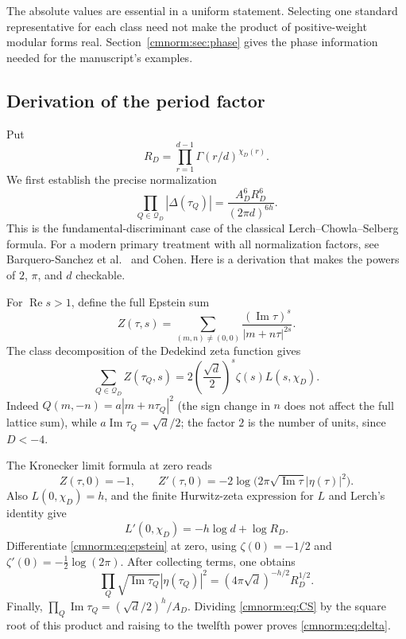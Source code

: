 The absolute values are essential in a uniform statement. Selecting one
standard representative for each class need not make the product of
positive-weight modular forms real. Section~\ref{cmnorm:sec:phase} gives
the phase information needed for the manuscript's examples.

\subsection{Derivation of the period factor}

Put
\[
 R_D=\prod_{r=1}^{d-1}\Gamma(r/d)^{\chi_D(r)}.
\]
We first establish the precise normalization
\begin{equation}
 \prod_{Q\in\mathcal Q_D}|\Delta(\tau_Q)|
 =\frac{A_D^6 R_D^6}{(2\pi d)^{6h}}.
 \label{cmnorm:eq:delta}
\end{equation}
This is the fundamental-discriminant case of the classical
Lerch--Chowla--Selberg formula. For a modern primary treatment with
all normalization factors, see Barquero-Sanchez et al.\
\cite{cmnorm:Barquero} and Cohen\cite{cmnorm:Cohen2026}.
Here is a derivation that makes the powers of $2$, $\pi$, and $d$
checkable.

For $\operatorname{Re}s>1$, define the full Epstein sum
\[
 Z(\tau,s)=\sum_{(m,n)\neq(0,0)}
       \frac{(\operatorname{Im}\tau)^s}{|m+n\tau|^{2s}}.
\]
The class decomposition of the Dedekind zeta function gives
\begin{equation}
 \sum_{Q\in\mathcal Q_D} Z(\tau_Q,s)
 =2\left(\frac{\sqrt d}{2}\right)^s\zeta(s)L(s,\chi_D).
 \label{cmnorm:eq:epstein}
\end{equation}
Indeed $Q(m,-n)=a|m+n\tau_Q|^2$ (the sign change in $n$ does not
affect the full lattice sum), while
$a\operatorname{Im}\tau_Q=\sqrt d/2$; the factor $2$ is the
number of units, since $D<-4$.

The Kronecker limit formula at zero reads
\[
 Z(\tau,0)=-1,\qquad
 Z'(\tau,0)=-2\log\bigl(2\pi\sqrt{\operatorname{Im}\tau}
                               |\eta(\tau)|^2\bigr).
\]
Also $L(0,\chi_D)=h$, and the finite Hurwitz-zeta expression for $L$
and Lerch's identity give
\[
 L'(0,\chi_D)=-h\log d+\log R_D.
\]
Differentiate \eqref{cmnorm:eq:epstein} at zero, using
$\zeta(0)=-1/2$ and $\zeta'(0)=-\tfrac12\log(2\pi)$.
After collecting terms, one obtains
\begin{equation}
 \prod_Q\sqrt{\operatorname{Im}\tau_Q}|\eta(\tau_Q)|^2
 =(4\pi\sqrt d)^{-h/2}R_D^{1/2}.
 \label{cmnorm:eq:CS}
\end{equation}
Finally,
$\prod_Q\operatorname{Im}\tau_Q=(\sqrt d/2)^h/A_D$.
Dividing \eqref{cmnorm:eq:CS} by the square root of this product
and raising to the twelfth power proves \eqref{cmnorm:eq:delta}.

